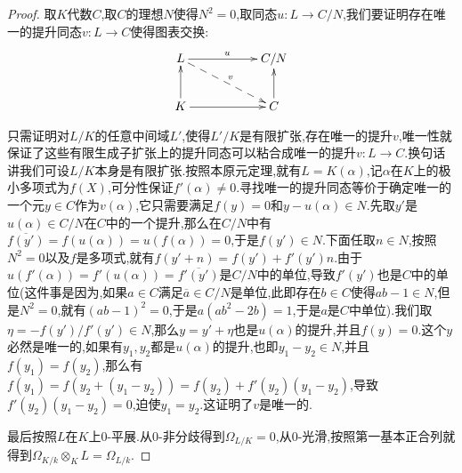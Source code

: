 \begin{enumerate}
\begin{proof}
		取$K$代数$C$,取$C$的理想$N$使得$N^2=0$,取同态$u:L\to C/N$,我们要证明存在唯一的提升同态$v:L\to C$使得图表交换:
		$$\xymatrix{L\ar[rr]^u\ar@{-->}[drr]^v&&C/N\\K\ar[u]\ar[rr]&&C\ar[u]}$$
		
		只需证明对$L/K$的任意中间域$L'$,使得$L'/K$是有限扩张,存在唯一的提升$v$,唯一性就保证了这些有限生成子扩张上的提升同态可以粘合成唯一的提升$v:L\to C$.换句话讲我们可设$L/K$本身是有限扩张.按照本原元定理,就有$L=K(\alpha)$,记$\alpha$在$K$上的极小多项式为$f(X)$,可分性保证$f'(\alpha)\not=0$.寻找唯一的提升同态等价于确定唯一的一个元$y\in C$作为$v(\alpha)$,它只需要满足$f(y)=0$和$y-u(\alpha)\in N$.先取$y'$是$u(\alpha)\in C/N$在$C$中的一个提升,那么在$C/N$中有$\overline{f(y')}=f(u(\alpha))=u(f(\alpha))=0$,于是$f(y')\in N$.下面任取$n\in N$,按照$N^2=0$以及$f$是多项式,就有$f(y'+n)=f(y')+f'(y')n$.由于$u(f'(\alpha))=f'(u(\alpha))=\overline{f'(y')}$是$C/N$中的单位,导致$f'(y')$也是$C$中的单位(这件事是因为,如果$a\in C$满足$\overline{a}\in C/N$是单位,此即存在$b\in C$使得$ab-1\in N$,但是$N^2=0$,就有$(ab-1)^2=0$,于是$a(ab^2-2b)=1$,于是$a$是$C$中单位).我们取$\eta=-f(y')/f'(y')\in N$,那么$y=y'+\eta$也是$u(\alpha)$的提升,并且$f(y)=0$.这个$y$必然是唯一的,如果有$y_1,y_2$都是$u(\alpha)$的提升,也即$y_1-y_2\in N$,并且$f(y_1)=f(y_2)$,那么有$f(y_1)=f(y_2+(y_1-y_2))=f(y_2)+f'(y_2)(y_1-y_2)$,导致$f'(y_2)(y_1-y_2)=0$,迫使$y_1=y_2$.这证明了$v$是唯一的.
		
		\qquad
		
		最后按照$L$在$K$上0-平展.从0-非分歧得到$\Omega_{L/K}=0$,从0-光滑,按照第一基本正合列就得到$\Omega_{K/k}\otimes_KL=\Omega_{L/k}$.
	\end{proof}
\end{enumerate}

